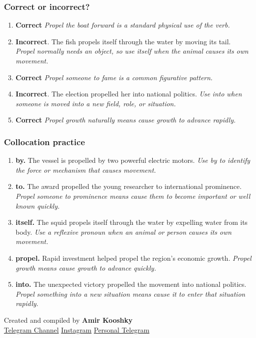 \documentclass[11pt]{article}
\begin{document}
\subsubsection{Correct or incorrect?}
\begin{enumerate}
  \item \textbf{Correct} \emph{Propel the boat forward is a standard physical use of the verb.}
  \item \textbf{Incorrect}. The fish propels itself through the water by moving its tail. \emph{Propel normally needs an object, so use itself when the animal causes its own movement.}
  \item \textbf{Correct} \emph{Propel someone to fame is a common figurative pattern.}
  \item \textbf{Incorrect}. The election propelled her into national politics. \emph{Use into when someone is moved into a new field, role, or situation.}
  \item \textbf{Correct} \emph{Propel growth naturally means cause growth to advance rapidly.}
\end{enumerate}

\subsubsection{Collocation practice}
\begin{enumerate}
  \item \textbf{by.} The vessel is propelled by two powerful electric motors. \emph{Use by to identify the force or mechanism that causes movement.}
  \item \textbf{to.} The award propelled the young researcher to international prominence. \emph{Propel someone to prominence means cause them to become important or well known quickly.}
  \item \textbf{itself.} The squid propels itself through the water by expelling water from its body. \emph{Use a reflexive pronoun when an animal or person causes its own movement.}
  \item \textbf{propel.} Rapid investment helped propel the region's economic growth. \emph{Propel growth means cause growth to advance quickly.}
  \item \textbf{into.} The unexpected victory propelled the movement into national politics. \emph{Propel something into a new situation means cause it to enter that situation rapidly.}
\end{enumerate}

\vfill
\begin{center}
\small\color{Muted} Created and compiled by \textbf{Amir Kooshky}\\
\href{https://t.me/KooshkyTOEFL}{Telegram Channel}\quad\textbullet\quad
\href{https://www.instagram.com/kooshkytoefl}{Instagram}\quad\textbullet\quad
\href{https://t.me/KooshkyTOEFL\_pv}{Personal Telegram}
\end{center}
\end{document}
